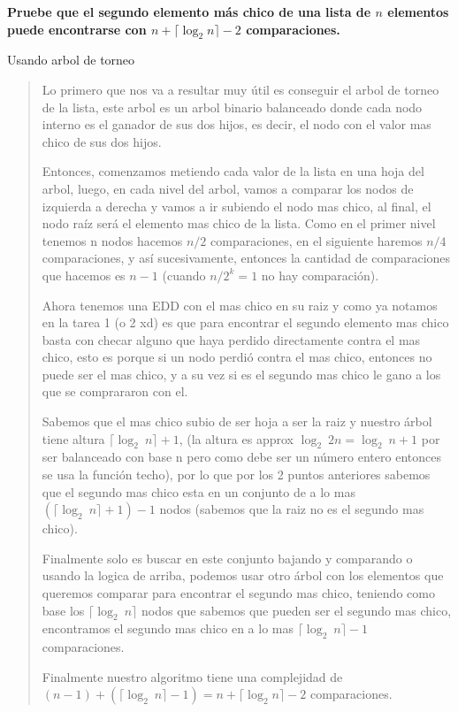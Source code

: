 \textbf{Pruebe que el segundo elemento más chico de una lista de $n$ elementos puede encontrarse con $n + \lceil \log_2 n \rceil - 2$ comparaciones.}\vspace{.2cm}

\textcolor{bibi}{Usando arbol de torneo}
\begin{quote}
    Lo primero que nos va a resultar muy útil es conseguir el arbol de torneo de la lista, este arbol es un arbol binario balanceado donde cada nodo interno es el ganador de sus dos hijos, es decir, el nodo con el valor mas chico de sus dos hijos. \vspace{.2cm}
    
    Entonces, comenzamos metiendo cada valor de la lista en una hoja del arbol, luego, en cada nivel del arbol, vamos a comparar los nodos de izquierda a derecha y vamos a ir subiendo el nodo mas chico, al final, el nodo raíz será el elemento mas chico de la lista. Como en el primer nivel tenemos n nodos hacemos $n/2$ comparaciones, en el siguiente haremos $n/4$ comparaciones, y así sucesivamente, entonces la cantidad de comparaciones que hacemos es $n - 1$ (cuando $n/2^k=1$ no hay comparación). \vspace{.2cm}

    Ahora tenemos una EDD con el mas chico en su raiz y como ya notamos en la tarea 1 (o 2 xd) es que para encontrar el segundo elemento mas chico basta con checar alguno que haya perdido directamente contra el mas chico, esto es porque si un nodo perdió contra el mas chico, entonces no puede ser el mas chico, y a su vez si es el segundo mas chico le gano a los que se comprararon con el.\vspace{.2cm}

    Sabemos que el mas chico subio de ser hoja a ser la raiz y nuestro árbol tiene altura $\lceil \log_2 \ n \rceil+1$, (la altura es approx $\log_2 \ 2n = \log_2 \ n +1 $ por ser balanceado con base n pero como debe ser un número entero entonces se usa la función techo), por lo que por los 2 puntos anteriores sabemos que el segundo mas chico esta en un conjunto de a lo mas $(\lceil \log_2 \ n \rceil+1) -1$ nodos (sabemos que la raiz no es el segundo mas chico). \vspace{.2cm}

    Finalmente solo es buscar en este conjunto bajando y comparando o usando la logica de arriba, podemos usar otro árbol con los elementos que queremos comparar para encontrar el segundo mas chico, teniendo como base los $\lceil \log_2 \ n \rceil$ nodos que sabemos que pueden ser el segundo mas chico, encontramos el segundo mas chico en a lo mas $\lceil \log_2 \ n \rceil-1$ comparaciones. \vspace{.2cm}

    Finalmente nuestro algoritmo tiene una complejidad de $(n-1)+(\lceil \log_2 \ n \rceil-1) = n + \lceil \log_2 n \rceil - 2$ comparaciones. \vspace{.2cm}
\end{quote}